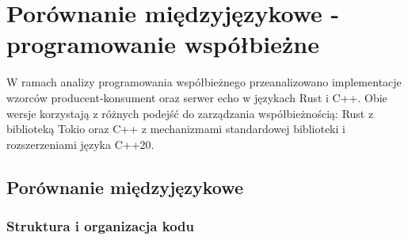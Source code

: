 \chapter{Porównanie międzyjęzykowe - programowanie współbieżne}

W ramach analizy programowania współbieżnego przeanalizowano implementacje wzorców producent-konsument oraz serwer echo w językach Rust i C++. Obie wersje korzystają z różnych podejść do zarządzania współbieżnością: Rust z biblioteką Tokio oraz C++ z mechanizmami standardowej biblioteki i rozszerzeniami języka C++20.

\section{Porównanie międzyjęzykowe}

\subsection{Struktura i organizacja kodu}

